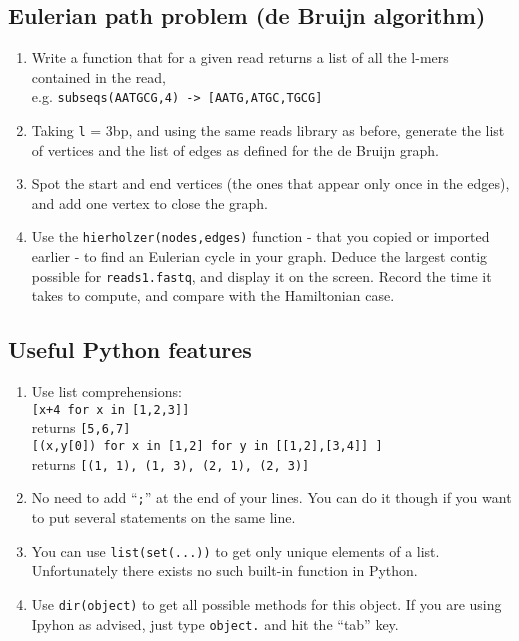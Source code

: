 \documentclass[a4paper,11pt]{article}
\begin{document}
\subsection{Eulerian path problem (de Bruijn algorithm)}
\begin{enumerate}
\item Write a function that for a given read returns a list of all the l-mers contained in the read, \\
e.g. \texttt{subseqs(AATGCG,4) ->  [AATG,ATGC,TGCG]}
\item Taking \texttt{l} = 3bp, and using the same reads library as before, generate the list of vertices and the list of edges as defined for the de Bruijn graph.
\item Spot the start and end vertices (the ones that appear only once in the edges), and add one vertex to close the graph.
\item Use the \texttt{hierholzer(nodes,edges)} function - that you copied or imported earlier - to find an Eulerian cycle in your graph. Deduce the largest contig possible for \texttt{reads1.fastq}, and display it on the screen. Record the time it takes to compute, and compare with the Hamiltonian case.
\end{enumerate}

\subsection{Useful Python features}
\begin{enumerate}
\item Use list comprehensions:\\
\texttt{[x+4 for x in [1,2,3]]} \\returns \texttt{[5,6,7]} \\
\texttt{[(x,y[0]) for x in [1,2] for y in [[1,2],[3,4]] ]}\\ returns \texttt{[(1, 1), (1, 3), (2, 1), (2, 3)]}
\item No need to add ``\texttt{;}'' at the end of your lines. You can do it though if you want to put several statements on the same line.
\item You can use \texttt{list(set(...))} to get only unique elements of a list. Unfortunately there exists no such built-in function in Python.
\item Use \texttt{dir(object)} to get all possible methods for this object. If you are using Ipyhon as advised, just type \texttt{object.} and hit the ``tab'' key.
\end{enumerate}
\end{document}
